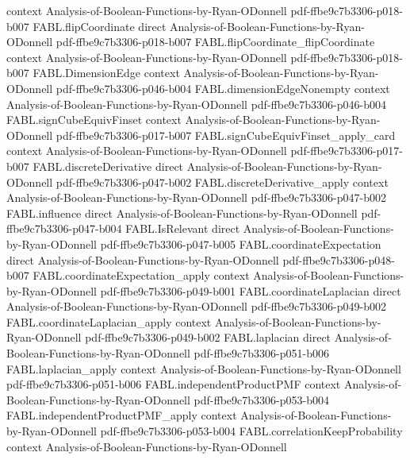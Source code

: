 \begin{theorem}
  {context}
  {Analysis-of-Boolean-Functions-by-Ryan-ODonnell}
  {pdf-ffbe9c7b3306-p018-b007}
\proofstep
  {FABL.flipCoordinate}
  {direct}
  {Analysis-of-Boolean-Functions-by-Ryan-ODonnell}
  {pdf-ffbe9c7b3306-p018-b007}
\proofstep
  {FABL.flipCoordinate_flipCoordinate}
  {context}
  {Analysis-of-Boolean-Functions-by-Ryan-ODonnell}
  {pdf-ffbe9c7b3306-p018-b007}
\proofstep
  {FABL.DimensionEdge}
  {context}
  {Analysis-of-Boolean-Functions-by-Ryan-ODonnell}
  {pdf-ffbe9c7b3306-p046-b004}
\proofstep
  {FABL.dimensionEdgeNonempty}
  {context}
  {Analysis-of-Boolean-Functions-by-Ryan-ODonnell}
  {pdf-ffbe9c7b3306-p046-b004}
\proofstep
  {FABL.signCubeEquivFinset}
  {context}
  {Analysis-of-Boolean-Functions-by-Ryan-ODonnell}
  {pdf-ffbe9c7b3306-p017-b007}
\proofstep
  {FABL.signCubeEquivFinset_apply_card}
  {context}
  {Analysis-of-Boolean-Functions-by-Ryan-ODonnell}
  {pdf-ffbe9c7b3306-p017-b007}
\proofstep
  {FABL.discreteDerivative}
  {direct}
  {Analysis-of-Boolean-Functions-by-Ryan-ODonnell}
  {pdf-ffbe9c7b3306-p047-b002}
\proofstep
  {FABL.discreteDerivative_apply}
  {context}
  {Analysis-of-Boolean-Functions-by-Ryan-ODonnell}
  {pdf-ffbe9c7b3306-p047-b002}
\proofstep
  {FABL.influence}
  {direct}
  {Analysis-of-Boolean-Functions-by-Ryan-ODonnell}
  {pdf-ffbe9c7b3306-p047-b004}
\proofstep
  {FABL.IsRelevant}
  {direct}
  {Analysis-of-Boolean-Functions-by-Ryan-ODonnell}
  {pdf-ffbe9c7b3306-p047-b005}
\proofstep
  {FABL.coordinateExpectation}
  {direct}
  {Analysis-of-Boolean-Functions-by-Ryan-ODonnell}
  {pdf-ffbe9c7b3306-p048-b007}
\proofstep
  {FABL.coordinateExpectation_apply}
  {context}
  {Analysis-of-Boolean-Functions-by-Ryan-ODonnell}
  {pdf-ffbe9c7b3306-p049-b001}
\proofstep
  {FABL.coordinateLaplacian}
  {direct}
  {Analysis-of-Boolean-Functions-by-Ryan-ODonnell}
  {pdf-ffbe9c7b3306-p049-b002}
\proofstep
  {FABL.coordinateLaplacian_apply}
  {context}
  {Analysis-of-Boolean-Functions-by-Ryan-ODonnell}
  {pdf-ffbe9c7b3306-p049-b002}
\proofstep
  {FABL.laplacian}
  {direct}
  {Analysis-of-Boolean-Functions-by-Ryan-ODonnell}
  {pdf-ffbe9c7b3306-p051-b006}
\proofstep
  {FABL.laplacian_apply}
  {context}
  {Analysis-of-Boolean-Functions-by-Ryan-ODonnell}
  {pdf-ffbe9c7b3306-p051-b006}
\proofstep
  {FABL.independentProductPMF}
  {context}
  {Analysis-of-Boolean-Functions-by-Ryan-ODonnell}
  {pdf-ffbe9c7b3306-p053-b004}
\proofstep
  {FABL.independentProductPMF_apply}
  {context}
  {Analysis-of-Boolean-Functions-by-Ryan-ODonnell}
  {pdf-ffbe9c7b3306-p053-b004}
\proofstep
  {FABL.correlationKeepProbability}
  {context}
  {Analysis-of-Boolean-Functions-by-Ryan-ODonnell}

\end{theorem}
